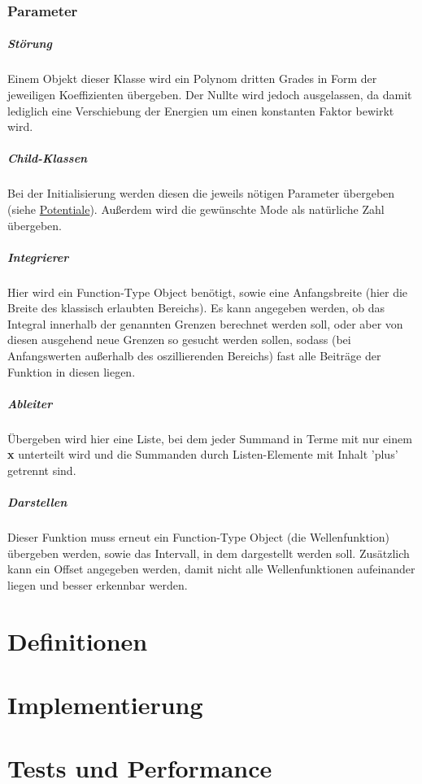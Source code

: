 \documentclass[12pt,twoside,a4paper]{book}
\begin{document}
\subsection{Parameter}

\paragraph{St\"{o}rung}Einem Objekt dieser Klasse wird ein Polynom dritten Grades in Form der jeweiligen Koeffizienten \"{u}bergeben. Der Nullte wird jedoch ausgelassen, da damit lediglich eine 
Verschiebung der Energien um einen konstanten Faktor bewirkt wird.

\paragraph{Child-Klassen}Bei der Initialisierung werden diesen die jeweils n\"{o}tigen Parameter
\"{u}bergeben (siehe \hyperref[sec:potential]{Potentiale}). Außerdem wird die gew\"{u}nschte Mode als nat\"{u}rliche Zahl \"{u}bergeben.

\paragraph{Integrierer}Hier wird ein Function-Type Object ben\"{o}tigt, sowie eine Anfangsbreite (hier die Breite des klassisch erlaubten Bereichs). Es kann angegeben werden, ob das Integral innerhalb der genannten Grenzen berechnet werden soll, oder aber von diesen ausgehend neue Grenzen so gesucht werden sollen, sodass (bei Anfangswerten außerhalb des oszillierenden Bereichs) fast alle Beitr\"{a}ge der Funktion in diesen liegen.

\paragraph{Ableiter}\"{U}bergeben wird hier eine Liste, bei dem jeder Summand in Terme mit nur 
einem \textbf{x} unterteilt wird und die Summanden durch Listen-Elemente mit Inhalt 'plus' getrennt sind. 

\paragraph{Darstellen}Dieser Funktion muss erneut ein Function-Type Object (die Wellenfunktion) \"{u}bergeben werden, sowie das Intervall, in dem dargestellt werden soll. Zus\"{a}tzlich kann ein Offset angegeben werden, damit nicht alle Wellenfunktionen aufeinander liegen und besser erkennbar werden.

\chapter{Definitionen}



\chapter{Implementierung}




\chapter{Tests und Performance}
\end{document}
